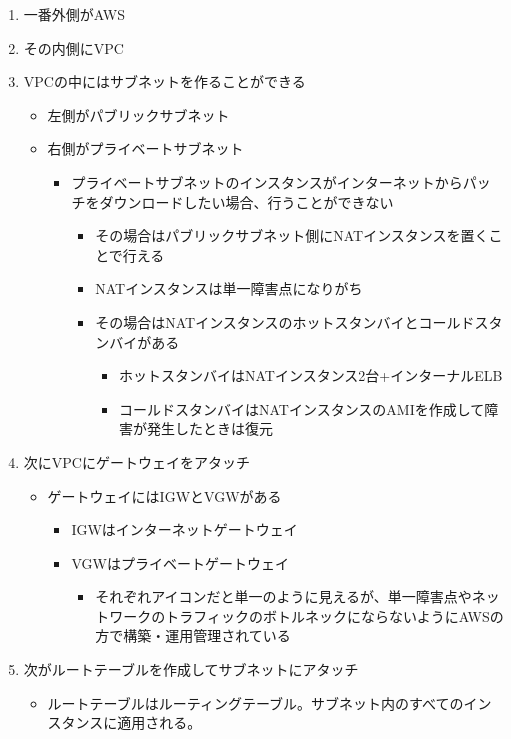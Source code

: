 \documentclass[11pt]{article}
\begin{document}
\begin{enumerate}
\item 一番外側がAWS
\item その内側にVPC
\item VPCの中にはサブネットを作ることができる
\begin{itemize}
\item 左側がパブリックサブネット
\item 右側がプライベートサブネット
\begin{itemize}
\item プライベートサブネットのインスタンスがインターネットからパッチをダウンロードしたい場合、行うことができない
\begin{itemize}
\item その場合はパブリックサブネット側にNATインスタンスを置くことで行える
\item NATインスタンスは単一障害点になりがち
\item その場合はNATインスタンスのホットスタンバイとコールドスタンバイがある
\begin{itemize}
\item ホットスタンバイはNATインスタンス2台+インターナルELB
\item コールドスタンバイはNATインスタンスのAMIを作成して障害が発生したときは復元
\end{itemize}
\end{itemize}
\end{itemize}
\end{itemize}
\item 次にVPCにゲートウェイをアタッチ
\begin{itemize}
\item ゲートウェイにはIGWとVGWがある
\begin{itemize}
\item IGWはインターネットゲートウェイ
\item VGWはプライベートゲートウェイ
\begin{itemize}
\item それぞれアイコンだと単一のように見えるが、単一障害点やネットワークのトラフィックのボトルネックにならないようにAWSの方で構築・運用管理されている
\end{itemize}
\end{itemize}
\end{itemize}
\item 次がルートテーブルを作成してサブネットにアタッチ
\begin{itemize}
\item ルートテーブルはルーティングテーブル。サブネット内のすべてのインスタンスに適用される。

\end{itemize}
\end{enumerate}
\end{document}
